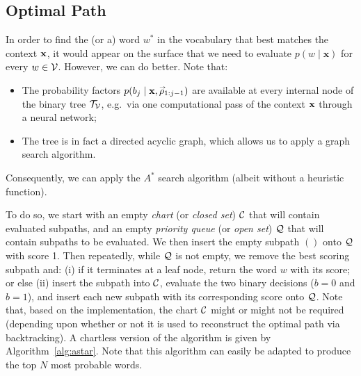 \documentclass[a4paper]{article}
\newcommand{\rvec}[1]{\accentset{\rightarrow}{#1}}
\begin{document}
\subsection{Optimal Path}

In order to find the (or a) word $w^*$ in the vocabulary that best matches the context ${\bf x}$, it would appear on the surface
that we need to evaluate $p(w\;|\;\textbf{x})$ for every $w\in{\cal V}$. However, we can do better. Note that:
\begin{itemize}
\item The probability factors $p(b_j\;|\;\textbf{x},\rvec{\rho}_{1:j-1})$ are available at every internal node of the binary tree ${\cal T}_{\cal V}$,
e.g.\ via one computational pass of the context ${\bf x}$ through a neural network;

\item The tree is in fact a directed acyclic graph, which allows us to apply a graph search algorithm.
\end{itemize}
Consequently, we can apply the $A^*$ search algorithm (albeit without a heuristic function).

To do so, we start with an empty {\em chart} (or {\em closed set}) ${\cal C}$ that will contain evaluated subpaths,
and an empty {\em priority queue} (or {\em open set}) ${\cal Q}$ that will contain subpaths to be evaluated.
We then insert the empty subpath $()$ onto ${\cal Q}$ with score 1.
Then repeatedly, while ${\cal Q}$ is not empty, we remove the best scoring subpath and: (i) if it terminates at a leaf node, return the word $w$ with its score;
or else (ii) insert the subpath into ${\cal C}$, evaluate the two binary decisions ($b=0$ and $b=1$), and insert each new subpath with its corresponding score onto ${\cal Q}$.
Note that, based on the implementation, the chart ${\cal C}$ might or might not be required (depending upon whether or not it is used to reconstruct the optimal path via backtracking).
A chartless version of the algorithm is given by Algorithm~\ref{alg:astar}. Note that this algorithm can easily be adapted to produce the top $N$ most probable words.
\end{document}
